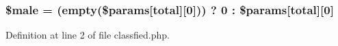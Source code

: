 \subsubsection[{\texorpdfstring{\$male}{$male}}]{\setlength{\rightskip}{0pt plus 5cm}\$male = (empty(\$params\mbox{[}\textquotesingle{}total\textquotesingle{}\mbox{]}\mbox{[}0\mbox{]})) ? \textquotesingle{}0\textquotesingle{} \+: \$params\mbox{[}\textquotesingle{}total\textquotesingle{}\mbox{]}\mbox{[}0\mbox{]}}\hypertarget{classfied_8php_a6821aca48174358a0fdb83bde51bd7de}{}\label{classfied_8php_a6821aca48174358a0fdb83bde51bd7de}


Definition at line 2 of file classfied.\+php.

